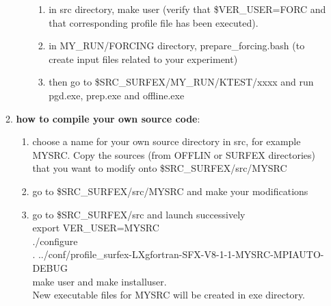 \begin{enumerate}
\begin{enumerate}
\begin{enumerate}
						\begin{enumerate}
							\item in src directory, make user (verify that \$VER\_USER=FORC and that corresponding profile file has been executed).
							\item in MY\_RUN/FORCING directory, prepare\_forcing.bash (to create input files related to your experiment)
							\item then go to \$SRC\_SURFEX/MY\_RUN/KTEST/xxxx and run pgd.exe, prep.exe and offline.exe
						\end{enumerate}
				\end{enumerate}
			\item {\bf{how to compile your own source code}}:
				\begin{enumerate}
					\item choose a name for your own source directory in src, for example MYSRC. Copy the sources (from OFFLIN or SURFEX directories) that you want to modify onto \$SRC\_SURFEX/src/MYSRC
					\item go to \$SRC\_SURFEX/src/MYSRC and make your modifications
					\item go to \$SRC\_SURFEX/src and launch successively \\
						export VER\_USER=MYSRC \\
./configure \\.
../conf/profile\_surfex-LXgfortran-SFX-V8-1-1-MYSRC-MPIAUTO-DEBUG \\
make user and make installuser. \\
New executable files for MYSRC will be created in exe directory.
				\end{enumerate}
		\end{enumerate}
\end{enumerate}
